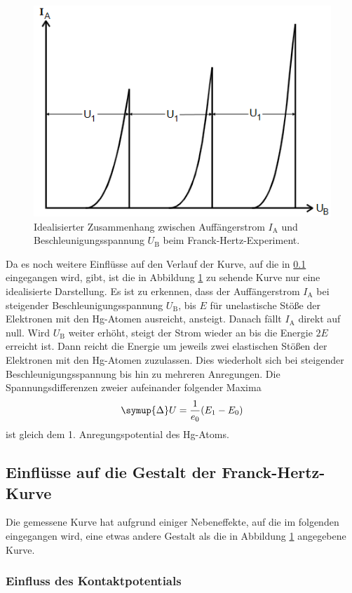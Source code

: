 \begin{figure}
    \centering
    \caption{Idealisierter Zusammenhang zwischen Auffängerstrom $I_\text{A}$ und Beschleunigungsspannung $U_\text{B}$ beim Franck-Hertz-Experiment.\cite{v601}}
    \label{fig:id}
    \includegraphics[width = 0.6 \textwidth]{pics/ideal.png}
\end{figure}
Da es noch weitere Einflüsse auf den Verlauf der Kurve, auf die in \ref{subsec:einflüsse} eingegangen wird, gibt, ist die in Abbildung \ref{fig:id} zu sehende Kurve nur eine idealisierte Darstellung.
Es ist zu erkennen, dass der Auffängerstrom $I_\text{A}$ bei steigender Beschleunigungsspannung $U_\text{B}$, bis $E$ für unelastische Stöße der Elektronen mit den Hg-Atomen ausreicht, ansteigt. Danach fällt $I_\text{A}$ direkt auf null.
Wird $U_\text{B}$ weiter erhöht, steigt der Strom wieder an bis die Energie $2E$ erreicht ist. Dann reicht die Energie um jeweils zwei elastischen Stößen der Elektronen mit den Hg-Atomen zuzulassen. Dies
wiederholt sich bei steigender Beschleunigungsspannung bis hin zu mehreren Anregungen.
Die Spannungsdifferenzen zweier aufeinander folgender Maxima
\begin{equation}
    \symup{\Delta}U= \frac{1}{e_0} (E_1- E_0)
\end{equation}
ist gleich dem 1. Anregungspotential des Hg-Atoms.

\subsection{Einflüsse auf die Gestalt der Franck-Hertz-Kurve}
\label{subsec:einflüsse}

Die gemessene Kurve hat aufgrund einiger Nebeneffekte, auf die im folgenden eingegangen wird, eine etwas andere Gestalt als die in Abbildung \ref{fig:id} angegebene Kurve.

\subsubsection{Einfluss des Kontaktpotentials}

